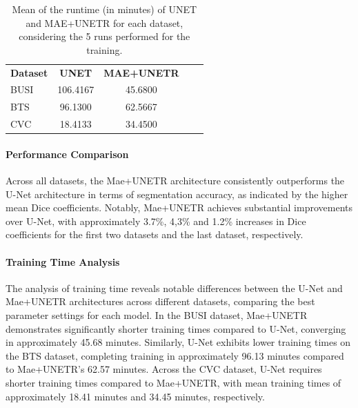 \begin{table}[H]
\begin{center}
\begin{tabular}{p{2cm}cccc}
    \textbf{Dataset} & \textbf{UNET} & \textbf{MAE+UNETR} \\
    BUSI & 106.4167 & 45.6800\\
    BTS & 96.1300 & 62.5667\\
    CVC & 18.4133 & 34.4500\\
\end{tabular}
\caption{Mean of the runtime (in minutes) of UNET and MAE+UNETR for each dataset, considering the 5 runs performed for the training.}
\label{tab:times}
\end{center}
\end{table}

\paragraph{Performance Comparison}
Across all datasets, the Mae+UNETR architecture consistently outperforms the U-Net architecture in terms of segmentation accuracy, as indicated by the higher mean Dice coefficients. Notably, Mae+UNETR achieves substantial improvements over U-Net, with approximately 3.7\%, 4,3\% and 1.2\% increases in Dice coefficients for the first two datasets and the last dataset, respectively.

\paragraph{Training Time Analysis}
The analysis of training time reveals notable differences between the U-Net and Mae+UNETR architectures across different datasets, comparing the best parameter settings for each model. In the BUSI dataset, Mae+UNETR demonstrates significantly shorter training times compared to U-Net, converging in approximately 45.68 minutes. Similarly, U-Net exhibits lower training times on the BTS dataset, completing training in approximately 96.13 minutes compared to Mae+UNETR's 62.57 minutes. Across the CVC dataset, U-Net requires shorter training times compared to Mae+UNETR, with mean training times of approximately 18.41 minutes and 34.45 minutes, respectively.

